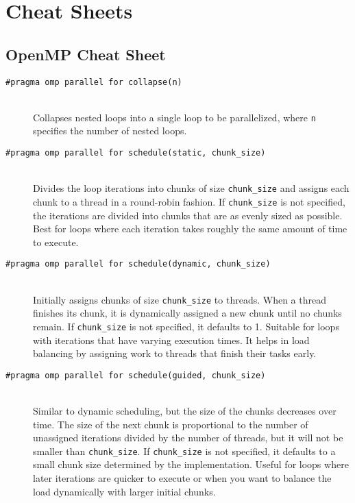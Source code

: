 \section{Cheat Sheets}
\subsection{OpenMP Cheat Sheet}
\begin{description}
    \item[\texttt{\#pragma omp parallel for collapse(n)}] \hfill \\
        Collapses nested loops into a single loop to be parallelized, where \texttt{n} specifies the number of nested loops.
    
    \item[\texttt{\#pragma omp parallel for schedule(static, chunk\_size)}] \hfill \\
        Divides the loop iterations into chunks of size \texttt{chunk\_size} and assigns each chunk to a thread in a round-robin fashion. If \texttt{chunk\_size} is not specified, the iterations are divided into chunks that are as evenly sized as possible. Best for loops where each iteration takes roughly the same amount of time to execute.
    
    \item[\texttt{\#pragma omp parallel for schedule(dynamic, chunk\_size)}] \hfill \\
        Initially assigns chunks of size \texttt{chunk\_size} to threads. When a thread finishes its chunk, it is dynamically assigned a new chunk until no chunks remain. If \texttt{chunk\_size} is not specified, it defaults to 1. Suitable for loops with iterations that have varying execution times. It helps in load balancing by assigning work to threads that finish their tasks early.
    
    \item[\texttt{\#pragma omp parallel for schedule(guided, chunk\_size)}] \hfill \\
        Similar to dynamic scheduling, but the size of the chunks decreases over time. The size of the next chunk is proportional to the number of unassigned iterations divided by the number of threads, but it will not be smaller than \texttt{chunk\_size}. If \texttt{chunk\_size} is not specified, it defaults to a small chunk size determined by the implementation. Useful for loops where later iterations are quicker to execute or when you want to balance the load dynamically with larger initial chunks.
    

\end{description}
